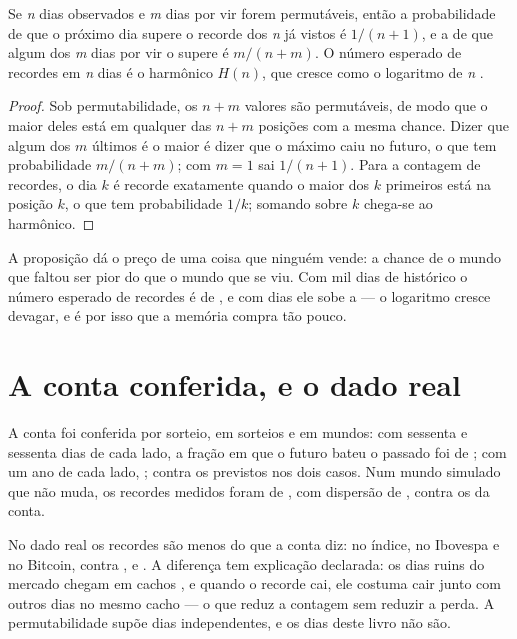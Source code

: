 \begin{proposicao}\label{prop:recorde}
Se \emph{n} dias observados e \emph{m} dias por vir forem permutáveis, então a probabilidade de que
o próximo dia supere o recorde dos \emph{n} já vistos é $1/(n+1)$, e a de que algum dos \emph{m}
dias por vir o supere é $m/(n+m)$. O número esperado de recordes em \emph{n} dias é o harmônico
$H(n)$, que cresce como o logaritmo de \emph{n} \cite{arnold1998records}.
\end{proposicao}

\begin{proof}
Sob permutabilidade, os $n+m$ valores são permutáveis, de modo que o maior deles está em qualquer
das $n+m$ posições com a mesma chance. Dizer que algum dos $m$ últimos é o maior é dizer que o
máximo caiu no futuro, o que tem probabilidade $m/(n+m)$; com $m=1$ sai $1/(n+1)$. Para a contagem
de recordes, o dia $k$ é recorde exatamente quando o maior dos $k$ primeiros está na posição $k$,
o que tem probabilidade $1/k$; somando sobre $k$ chega-se ao harmônico.
\end{proof}

A proposição dá o preço de uma coisa que ninguém vende: a chance de o mundo que faltou ser pior do
que o mundo que se viu. Com mil dias de histórico o número esperado de recordes é de \numRecordeEsperadoMil{}, e com
\numRecordeDiasPorMundo{} dias ele sobe a \numRecordeEsperadoMundo{} --- o
logaritmo cresce devagar, e é por isso que a memória compra tão pouco.

\section{A conta conferida, e o dado real}

A conta foi conferida por sorteio, em \numRecordeSorteios{} sorteios e em \numRecordeSementes{}
mundos: com sessenta e sessenta dias de cada lado, a fração em que o futuro bateu o passado foi de
\numRecordeMedidoSessenta{}; com um ano de cada lado, \numRecordeMedidoAno{}; contra os
\numRecordeProbabilidade{} previstos nos dois casos. Num mundo simulado que não muda, os recordes
medidos foram de \numRecordeParado{}, com dispersão de \numRecordeParadoDispersao{}, contra os
\numRecordeEsperadoMundo{} da conta.

No dado real os recordes são menos do que a conta diz: \numRecordeIndiceConta{} no índice,
\numRecordeIbovespaConta{} no Ibovespa e \numRecordeBitcoinConta{} no Bitcoin, contra
\numRecordeIndiceEsperado{}, \numRecordeIbovespaEsperado{} e \numRecordeBitcoinEsperado{}. A
diferença tem explicação declarada: os dias ruins do mercado chegam em cachos \cite{cont2001empirical}, e quando o recorde
cai, ele costuma cair junto com outros dias no mesmo cacho --- o que reduz a contagem sem reduzir a
perda. A permutabilidade supõe dias independentes, e os dias deste livro não são.

